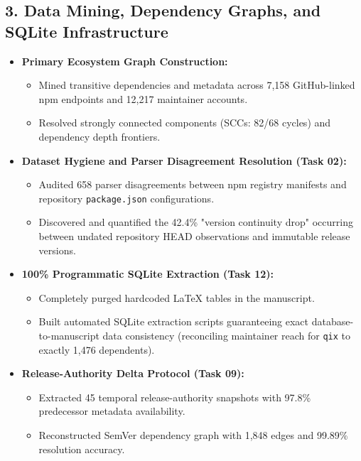 \documentclass[11pt,a4paper]{article}
\begin{document}
\subsection{3. Data Mining, Dependency Graphs, and SQLite Infrastructure}
\begin{itemize}
  \item \textbf{Primary Ecosystem Graph Construction:}
  \begin{itemize}
    \item Mined transitive dependencies and metadata across 7,158 GitHub-linked npm endpoints and 12,217 maintainer accounts.
    \item Resolved strongly connected components (SCCs: 82/68 cycles) and dependency depth frontiers.
  \end{itemize}
  \item \textbf{Dataset Hygiene and Parser Disagreement Resolution (Task 02):}
  \begin{itemize}
    \item Audited 658 parser disagreements between npm registry manifests and repository \nolinkurl{package.json} configurations.
    \item Discovered and quantified the 42.4\% "version continuity drop" occurring between undated repository HEAD observations and immutable release versions.
  \end{itemize}
  \item \textbf{100\% Programmatic SQLite Extraction (Task 12):}
  \begin{itemize}
    \item Completely purged hardcoded LaTeX tables in the manuscript.
    \item Built automated SQLite extraction scripts guaranteeing exact database-to-manuscript data consistency (reconciling maintainer reach for \nolinkurl{qix} to exactly 1,476 dependents).
  \end{itemize}
  \item \textbf{Release-Authority Delta Protocol (Task 09):}
  \begin{itemize}
    \item Extracted 45 temporal release-authority snapshots with 97.8\% predecessor metadata availability.
    \item Reconstructed SemVer dependency graph with 1,848 edges and 99.89\% resolution accuracy.
  \end{itemize}
\end{itemize}
\end{document}
